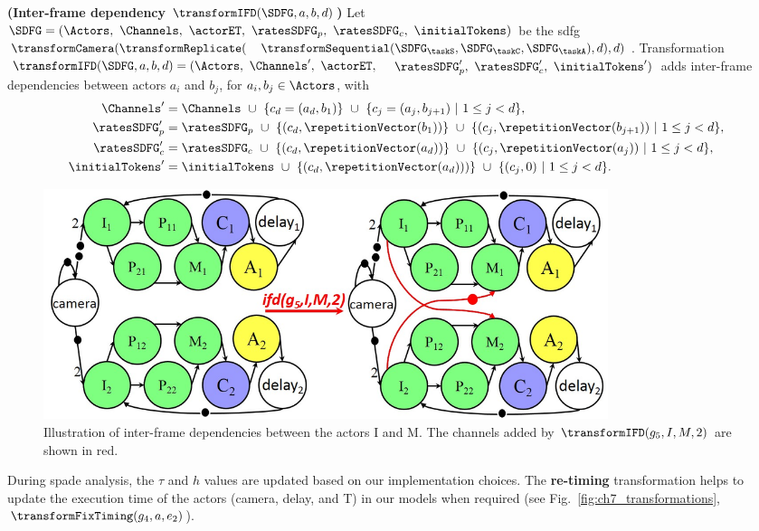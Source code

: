 \begin{definition}
{\textbf{(Inter-frame dependency $\transformIFD(\SDFG,a,b,d)$)}}
Let $\SDFG = (\Actors,\ \Channels,\ \actorET,\ \ratesSDFG_p,\ \ratesSDFG_c,\ \initialTokens)$ be the \gls{sdfg} $\transformCamera(\transformReplicate($ $\transformSequential(\SDFG_{\taskS},\SDFG_{\taskC},\SDFG_{\taskA}),d),d)$. 
Transformation $\transformIFD(\SDFG,a,b,d)= (\Actors,\ \Channels^{\prime},\ \actorET,\ $ $ \ratesSDFG_p^{\prime},\ \ratesSDFG_c^{\prime},\ \initialTokens^{\prime})$ adds inter-frame dependencies between actors $a_i$ and $b_j$, for $a_i,b_j\in\Actors$, with 
\begin{align}
 \Channels^{\prime}&= \Channels\ \cup\ \{c_d=(a_d,b_1)\}\ \cup\ \{c_j=(a_{j},b_{j+1}) \ |\ 1\le j< d\}, \nonumber\\
\ratesSDFG_p^{\prime}&=\ratesSDFG_p\ \cup\ \{(c_d,\repetitionVector(b_1))\}\ \cup\ \{(c_j,\repetitionVector(b_{j+1})) \ |\ 1\le j< d\},\nonumber\\ 
\ratesSDFG_c^{\prime}&=\ratesSDFG_c\ \cup\ \{(c_d,\repetitionVector(a_d))\}\ \cup\ \{(c_j,\repetitionVector(a_{j})) \ |\ 1\le j< d\},\nonumber\\ 
\initialTokens^{\prime}&=\initialTokens\ \cup\ \{(c_d,\repetitionVector(a_d)))\}\ \cup\ \{(c_j,0) \ |\ 1\le j< d\}.\nonumber
\end{align}
\end{definition}

\begin{figure}[ht]
    \centering
    \includegraphics[width=0.8\textwidth]{images/transformIFD.jpg}
    \caption{Illustration of inter-frame dependencies between the actors I and M. The channels added by $\transformIFD(g_5,I,M,2)$ are shown in red.}
    \label{fig:ch7_transformationIFD}
\end{figure}

During \gls{spade} analysis, the $\tau$ and $h$ values are updated based on our implementation choices. The \textbf{re-timing} transformation helps to update the execution time of the actors (camera, delay, and T) in our models when required (see Fig.~\ref{fig:ch7_transformations}, $\transformFixTiming(g_4,a,e_2)$). 

